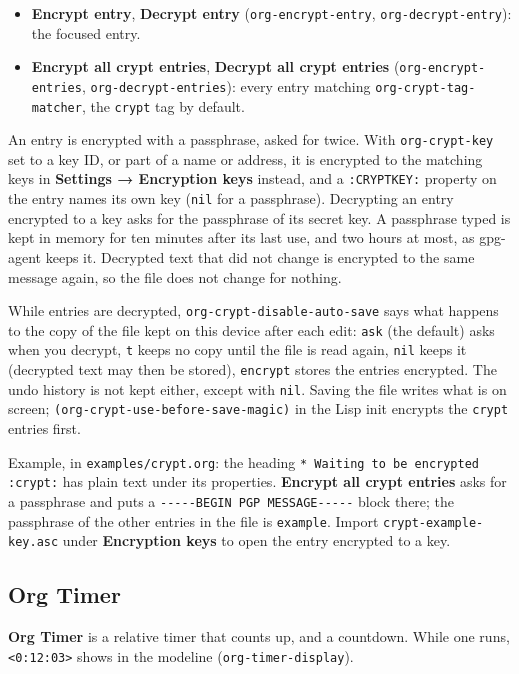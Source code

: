 \documentclass[11pt]{article}
\begin{document}
\begin{itemize}
\item \textbf{Encrypt entry}, \textbf{Decrypt entry} (\texttt{org-encrypt-entry}, \texttt{org-decrypt-entry}): the focused entry.
\item \textbf{Encrypt all crypt entries}, \textbf{Decrypt all crypt entries} (\texttt{org-encrypt-entries}, \texttt{org-decrypt-entries}): every entry matching \texttt{org-crypt-tag-matcher}, the \texttt{crypt} tag by default.
\end{itemize}

An entry is encrypted with a passphrase, asked for twice. With \texttt{org-crypt-key} set to a key ID, or part of a name or address, it is encrypted to the matching keys in \textbf{Settings → Encryption keys} instead, and a \texttt{:CRYPTKEY:} property on the entry names its own key (\texttt{nil} for a passphrase). Decrypting an entry encrypted to a key asks for the passphrase of its secret key. A passphrase typed is kept in memory for ten minutes after its last use, and two hours at most, as gpg-agent keeps it. Decrypted text that did not change is encrypted to the same message again, so the file does not change for nothing.

While entries are decrypted, \texttt{org-crypt-disable-auto-save} says what happens to the copy of the file kept on this device after each edit: \texttt{ask} (the default) asks when you decrypt, \texttt{t} keeps no copy until the file is read again, \texttt{nil} keeps it (decrypted text may then be stored), \texttt{encrypt} stores the entries encrypted. The undo history is not kept either, except with \texttt{nil}. Saving the file writes what is on screen; \texttt{(org-crypt-use-before-save-magic)} in the Lisp init encrypts the \texttt{crypt} entries first.

Example, in \texttt{examples/crypt.org}: the heading \texttt{* Waiting to be encrypted :crypt:} has plain text under its properties. \textbf{Encrypt all crypt entries} asks for a passphrase and puts a \texttt{-{}-{}-{}-{}-BEGIN PGP MESSAGE-{}-{}-{}-{}-} block there; the passphrase of the other entries in the file is \texttt{example}. Import \texttt{crypt-example-key.asc} under \textbf{Encryption keys} to open the entry encrypted to a key.

\subsection{Org Timer}
\label{sec:orge716ba5}
\textbf{Org Timer} is a relative timer that counts up, and a countdown. While one runs, \texttt{<0:12:03>} shows in the modeline (\texttt{org-timer-display}).
\end{document}
